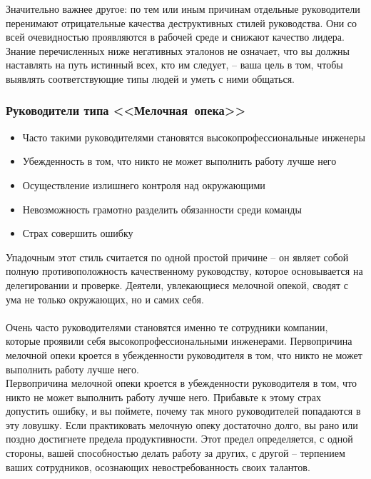 \documentclass{../industrial-development}
\begin{document}
Значительно важнее другое: по тем или иным причинам отдельные руководители перенимают отрицательные качества деструктивных стилей руководства. Они со всей очевидностью проявляются в рабочей среде и снижают качество лидера. Знание перечисленных ниже негативных эталонов не означает, что вы должны наставлять на путь истинный всех, кто им следует, – ваша цель в том, чтобы выявлять соответствующие типы людей и уметь с ними общаться. 




\begin{frame} \frametitle{Руководители типа <<Мелочная~опека>>}
\begin{itemize}
		\item Часто такими руководителями становятся высокопрофессиональные инженеры
		\item Убежденность в том, что никто не может выполнить работу лучше него
		\item Осуществление излишнего контроля над окружающими
		\item Невозможность грамотно разделить обязанности среди команды
		\item Страх совершить ошибку
	\end{itemize}
\end{frame}
\lecturenotes
	Упадочным этот стиль считается по одной простой причине – он являет собой полную противоположность качественному руководству, которое основывается на делегировании и проверке. Деятели, увлекающиеся мелочной опекой, сводят с ума не только окружающих, но и самих себя. \\~\\
Очень часто руководителями становятся именно те сотрудники компании, которые проявили себя высокопрофессиональными инженерами. Первопричина мелочной опеки кроется в убежденности руководителя в том, что никто не может выполнить работу лучше него.  \\
Первопричина мелочной опеки кроется в убежденности руководителя в том, что никто не может выполнить работу лучше него. Прибавьте к этому страх допустить ошибку, и вы поймете, почему так много руководителей попадаются в эту ловушку. Если практиковать мелочную опеку достаточно долго, вы рано или поздно достигнете предела продуктивности. Этот предел определяется, с одной стороны, вашей способностью делать работу за других, с другой – терпением ваших сотрудников, осознающих невостребованность своих талантов.
\end{document}
